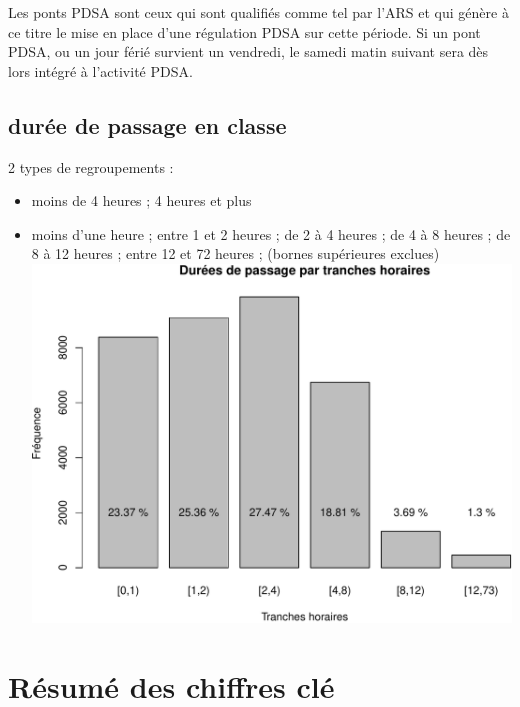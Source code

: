\documentclass[]{article}
\begin{document}
Les ponts PDSA sont ceux qui sont qualifiés comme tel par l'ARS et qui
génère à ce titre le mise en place d'une régulation PDSA sur cette
période. Si un pont PDSA, ou un jour férié survient un vendredi, le
samedi matin suivant sera dès lors intégré à l'activité PDSA.

\subsection{durée de passage en
classe}\label{duree-de-passage-en-classe}

2 types de regroupements :

\begin{itemize}
\itemsep1pt\parskip0pt
\item
  moins de 4 heures ; 4 heures et plus
\item
  moins d'une heure ; entre 1 et 2 heures ; de 2 à 4 heures ; de 4 à 8
  heures ; de 8 à 12 heures ; entre 12 et 72 heures ; (bornes
  supérieures exclues)
  \includegraphics{rapport_2014_files/figure-latex/duree_tranches_horaires-1.pdf}
\end{itemize}

\section{Résumé des chiffres clé}\label{resume-des-chiffres-cle}
\end{document}
